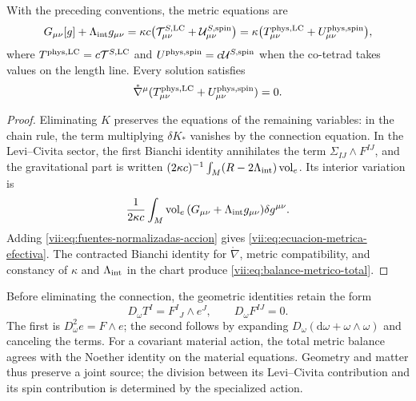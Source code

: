 \begin{proposition}
\label{vii:prop:fuente-metrica-balance}
With the preceding conventions, the metric equations are
\begin{equation}
 G_{\mu\nu}[g]+\Lambda_{\rm int}g_{\mu\nu}
 =\kappa c\bigl(\mathcal T^{S,\rm LC}_{\mu\nu}
                    +\mathcal U^{S,\rm spin}_{\mu\nu}\bigr)
 =\kappa\bigl(T^{\rm phys,LC}_{\mu\nu}
                    +U^{\rm phys,spin}_{\mu\nu}\bigr),
 \label{vii:eq:ecuacion-metrica-efectiva}
\end{equation}
where \(T^{\rm phys,LC}=c\mathcal T^{S,\rm LC}\) and
\(U^{\rm phys,spin}=c\mathcal U^{S,\rm spin}\) when the
co-tetrad takes values on the length line. Every solution satisfies
\begin{equation}
 \mathring\nabla^\mu
   (T^{\rm phys,LC}_{\mu\nu}+U^{\rm phys,spin}_{\mu\nu})=0.
 \label{vii:eq:balance-metrico-total}
\end{equation}
\end{proposition}
\begin{proof}
Eliminating \(K\) preserves the equations of the remaining
variables: in the chain rule, the term multiplying
\(\delta K_*\) vanishes by the connection equation. In the
Levi--Civita sector, the first Bianchi identity annihilates the term
\(\Sigma_{IJ}\wedge F^{IJ}\), and the gravitational part is written
\((2\kappa c)^{-1}\int_M(R-2\Lambda_{\rm int})\operatorname{vol}_e\).
Its interior variation is
\[
 \frac1{2\kappa c}\int_M\operatorname{vol}_e\,
        (G_{\mu\nu}+\Lambda_{\rm int}g_{\mu\nu})\delta g^{\mu\nu}.
\]
Adding \eqref{vii:eq:fuentes-normalizadas-accion} gives
\eqref{vii:eq:ecuacion-metrica-efectiva}. The contracted Bianchi identity
for \(\mathring\nabla\), metric compatibility, and constancy of
\(\kappa\) and \(\Lambda_{\rm int}\) in the chart
produce \eqref{vii:eq:balance-metrico-total}.
\end{proof}

Before eliminating the connection, the geometric identities retain
the form
\begin{equation}
 D_\omega T^I=F^I{}_{J}\wedge e^J,\qquad D_\omega F^{IJ}=0.
 \label{vii:eq:bianchi-cartan}
\end{equation}
The first is \(D_\omega^2e=F\wedge e\); the second follows
by expanding \(D_\omega(\mathrm d\omega+\omega\wedge\omega)\)
and canceling the terms. For a covariant material action, the
total metric balance agrees with the Noether identity on the
material equations. Geometry and matter thus preserve a joint
source; the division between its Levi--Civita contribution and its
spin contribution is determined by the specialized action.
